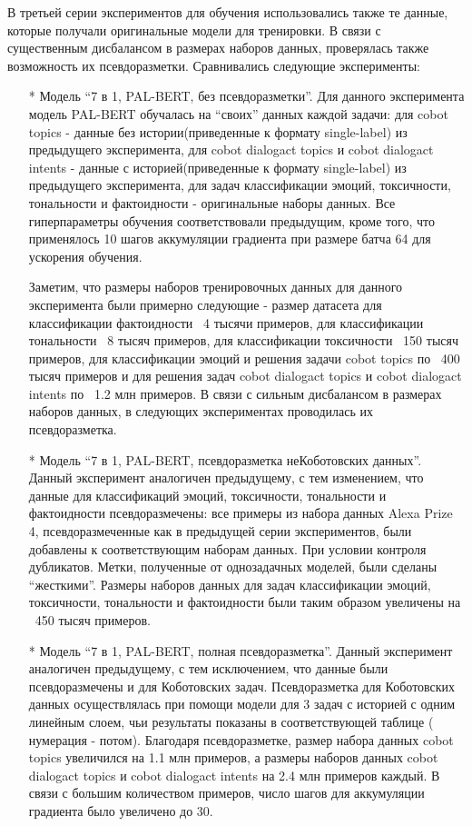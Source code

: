 В  третьей серии экспериментов для обучения использовались также те данные, которые получали оригинальные модели для тренировки. В связи с существенным дисбалансом в размерах наборов данных, проверялась также возможность их псевдоразметки. Сравнивались следующие эксперименты:  
\begin{itemize}
\item[*] Модель “7 в 1, PAL-BERT, без псевдоразметки”. Для данного эксперимента модель PAL-BERT обучалась на “своих” данных каждой задачи: для cobot topics - данные без истории(приведенные к формату single-label) из предыдущего эксперимента, для cobot dialogact topics и cobot dialogact intents - данные с историей(приведенные к формату single-label) из предыдущего эксперимента, для задач классификации эмоций, токсичности, тональности и фактоидности - оригинальные наборы данных. Все гиперпараметры обучения соответствовали предыдущим, кроме того, что применялось 10 шагов аккумуляции градиента при размере батча 64 для ускорения обучения.

Заметим, что размеры наборов тренировочных данных для данного эксперимента были примерно следующие - размер датасета для классификации фактоидности ~4 тысячи примеров, для классификации тональности ~8 тысяч примеров, для классификации токсичности ~150 тысяч примеров, для классификации эмоций и решения задачи cobot topics по ~400 тысяч примеров и для решения задач cobot dialogact topics и cobot dialogact intents по ~1.2 млн примеров. В связи с сильным дисбалансом в размерах наборов данных, в следующих экспериментах проводилась их псевдоразметка.

\item[*] Модель “7 в 1, PAL-BERT, псевдоразметка неКоботовских данных”. Данный эксперимент аналогичен предыдущему, с тем изменением, что данные для классификаций эмоций, токсичности, тональности и фактоидности псевдоразмечены: все примеры из набора данных Alexa Prize 4, псевдоразмеченные как в предыдущей серии экспериментов, были добавлены к соответствующим наборам данных. При условии контроля дубликатов. Метки, полученные от однозадачных моделей, были сделаны “жесткими”. Размеры наборов данных для задач классификации эмоций, токсичности, тональности и фактоидности были таким образом увеличены на ~450 тысяч примеров. 

\item[*] Модель “7  в 1, PAL-BERT, полная псевдоразметка”. Данный эксперимент аналогичен предыдущему, с тем исключением, что данные были псевдоразмечены и для Коботовских задач.  Псевдоразметка для Коботовских данных осуществлялась при помощи модели для 3 задач с историей с одним линейным слоем, чьи результаты показаны в соответствующей таблице ( нумерация - потом). Благодаря псевдоразметке, размер набора данных  cobot topics увеличился на 1.1 млн примеров, а размеры наборов данных cobot dialogact topics и cobot dialogact intents на 2.4 млн примеров каждый. В связи с большим количеством примеров, число шагов для аккумуляции градиента было увеличено до 30.


\end{itemize}
